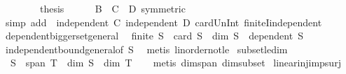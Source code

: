 \begin{isabellebody}
\ \ \isamarkupfalse%
\isanewline
\ \ \isamarkupfalse%
\ \isamarkupfalse%
\ {\isacharquery}{\kern0pt}thesis\isanewline
\ \ \ \ \isamarkupfalse%
\ {\isacartoucheopen}B\ {\isacharequal}{\kern0pt}\ C\ {\isasyminter}\ D{\isacartoucheclose}\ {\isacharbrackleft}{\kern0pt}symmetric{\isacharbrackright}{\kern0pt}\isanewline
\ \ \ \ \isamarkupfalse%
\ {\isacharparenleft}{\kern0pt}simp\ add{\isacharcolon}{\kern0pt}\ \ {\isacartoucheopen}independent\ C{\isacartoucheclose}\ {\isacartoucheopen}independent\ D{\isacartoucheclose}\ card{\isacharunderscore}{\kern0pt}Un{\isacharunderscore}{\kern0pt}Int\ finiteI{\isacharunderscore}{\kern0pt}independent{\isacharparenright}{\kern0pt}\isanewline
{}\isamarkupfalse%
%
\endisatagproof
{\isafoldproof}%
%
\isadelimproof
\isanewline
%
\endisadelimproof
\isanewline
{}\isamarkupfalse%
\ dependent{\isacharunderscore}{\kern0pt}biggerset{\isacharunderscore}{\kern0pt}general{\isacharcolon}{\kern0pt}\isanewline
\ \ {\isachardoublequoteopen}{\isacharparenleft}{\kern0pt}finite\ S\ {\isasymLongrightarrow}\ card\ S\ {\isachargreater}{\kern0pt}\ dim\ S{\isacharparenright}{\kern0pt}\ {\isasymLongrightarrow}\ dependent\ S{\isachardoublequoteclose}\isanewline
%
\isadelimproof
\ \ %
\endisadelimproof
%
\isatagproof
{}\isamarkupfalse%
\ independent{\isacharunderscore}{\kern0pt}bound{\isacharunderscore}{\kern0pt}general{\isacharbrackleft}{\kern0pt}of\ S{\isacharbrackright}{\kern0pt}\ \isamarkupfalse%
\ {\isacharparenleft}{\kern0pt}metis\ linorder{\isacharunderscore}{\kern0pt}not{\isacharunderscore}{\kern0pt}le{\isacharparenright}{\kern0pt}%
\endisatagproof
{\isafoldproof}%
%
\isadelimproof
\isanewline
%
\endisadelimproof
\isanewline
{}\isamarkupfalse%
\ subset{\isacharunderscore}{\kern0pt}le{\isacharunderscore}{\kern0pt}dim{\isacharcolon}{\kern0pt}\isanewline
\ \ {\isachardoublequoteopen}S\ {\isasymsubseteq}\ span\ T\ {\isasymLongrightarrow}\ dim\ S\ {\isasymle}\ dim\ T{\isachardoublequoteclose}\isanewline
%
\isadelimproof
\ \ %
\endisadelimproof
%
\isatagproof
{}\isamarkupfalse%
\ {\isacharparenleft}{\kern0pt}metis\ dim{\isacharunderscore}{\kern0pt}span\ dim{\isacharunderscore}{\kern0pt}subset{\isacharparenright}{\kern0pt}%
\endisatagproof
{\isafoldproof}%
%
\isadelimproof
\isanewline
%
\endisadelimproof
\isanewline
{}\isamarkupfalse%
\ linear{\isacharunderscore}{\kern0pt}inj{\isacharunderscore}{\kern0pt}imp{\isacharunderscore}{\kern0pt}surj{\isacharcolon}{\kern0pt}\isanewline

\end{isabellebody}
